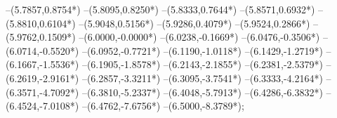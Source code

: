 {	--(5.7857,{0.8754*\yskala})
	--(5.8095,{0.8250*\yskala})
	--(5.8333,{0.7644*\yskala})
	--(5.8571,{0.6932*\yskala})
	--(5.8810,{0.6104*\yskala})
	--(5.9048,{0.5156*\yskala})
	--(5.9286,{0.4079*\yskala})
	--(5.9524,{0.2866*\yskala})
	--(5.9762,{0.1509*\yskala})
	--(6.0000,{-0.0000*\yskala})
	--(6.0238,{-0.1669*\yskala})
	--(6.0476,{-0.3506*\yskala})
	--(6.0714,{-0.5520*\yskala})
	--(6.0952,{-0.7721*\yskala})
	--(6.1190,{-1.0118*\yskala})
	--(6.1429,{-1.2719*\yskala})
	--(6.1667,{-1.5536*\yskala})
	--(6.1905,{-1.8578*\yskala})
	--(6.2143,{-2.1855*\yskala})
	--(6.2381,{-2.5379*\yskala})
	--(6.2619,{-2.9161*\yskala})
	--(6.2857,{-3.3211*\yskala})
	--(6.3095,{-3.7541*\yskala})
	--(6.3333,{-4.2164*\yskala})
	--(6.3571,{-4.7092*\yskala})
	--(6.3810,{-5.2337*\yskala})
	--(6.4048,{-5.7913*\yskala})
	--(6.4286,{-6.3832*\yskala})
	--(6.4524,{-7.0108*\yskala})
	--(6.4762,{-7.6756*\yskala})
	--(6.5000,{-8.3789*\yskala});
}
